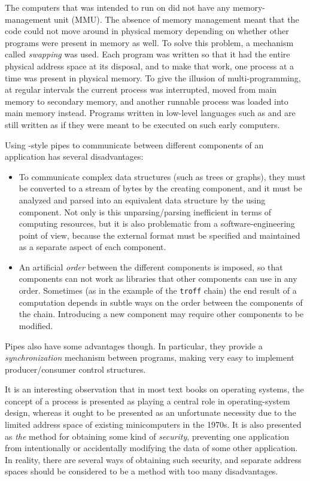 The computers that \unix{} was intended to run on did not have any
memory-management unit (MMU).  The absence of memory management meant
that the code could not move around in physical memory depending on
whether other programs were present in memory as well.  To solve this
problem, a mechanism called \emph{swapping} was used.  Each program
was written so that it had the entire physical address space at its
disposal, and to make that work, one process at a time was present in
physical memory.  To give the illusion of multi-programming, at
regular intervals the current process was interrupted, moved from main
memory to secondary memory, and another runnable process was loaded
into main memory instead.  Programs written in low-level languages
such as \clanguage{} and \cplusplus{} are still written as if they
were meant to be executed on such early computers.

Using \unix{}-style pipes to communicate between different components of
an application has several disadvantages:

\begin{itemize}
\item To communicate complex data structures (such as trees or
graphs), they must be converted to a stream of bytes by the
creating component, and it must be analyzed and parsed into an
equivalent data structure by the using component.  Not only is
this unparsing/parsing inefficient in terms of computing
resources, but it is also problematic from a
software-engineering point of view, because the external format
must be specified and maintained as a separate aspect of each
component.
\item An artificial \emph{order} between the different components is
imposed, so that components can not work as libraries that other
components can use in any order.  Sometimes (as in the example
of the \texttt{troff} chain) the end result of a computation
depends in subtle ways on the order between the components of
the chain.  Introducing a new component may require other
components to be modified.  
\end{itemize}

Pipes also have some advantages though.  In particular, they provide a
\emph{synchronization} mechanism between programs, making very easy to
implement producer/consumer control structures.

It is an interesting observation that in most text books on
operating systems, the concept of a process is presented as playing
a central role in operating-system design, whereas it ought to be
presented as an unfortunate necessity due to the limited address
space of existing minicomputers in the 1970s.  It is also presented
as \emph{the} method for obtaining some kind of \emph{security},
preventing one application from intentionally or accidentally
modifying the data of some other application.  In reality, there are
several ways of obtaining such security, and separate address spaces
should be considered to be a method with too many disadvantages. 

